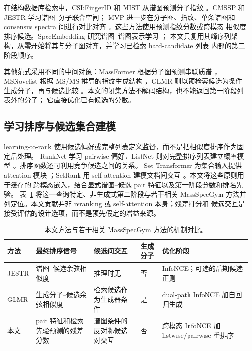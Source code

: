 \documentclass[UTF8,11pt]{ctexart}
\begin{document}
在结构数据库检索中，CSI:FingerID 和 MIST 从谱图预测分子指纹
\cite{duhrkop2015csifingerid,goldman2023mist}。CMSSP 和 JESTR 学习谱图--分子联合空间；
MVP 进一步在分子图、指纹、单条谱图和 consensus spectra 间进行对比对齐
\cite{chen2024cmssp,kalia2025jestr,chen2026mvp}。这些方法使用预测指纹分数或跨模态
相似度排序候选。SpecEmbedding 研究谱图--谱图表示学习 \cite{xiong2025specembedding}；
本文只复用其峰序列架构，从零开始将其与分子图对齐，并学习已检索 hard-candidate 列表
内部的第二阶段顺序。

其他范式采用不同的中间对象：MassFormer 根据分子图预测串联质谱
\cite{young2024massformer}，MSNovelist 根据 MS/MS 推导的指纹生成结构
\cite{stravs2022msnovelist}，GLMR 则以预检索候选为条件生成分子，再与候选比较
\cite{zhang2026glmr}。本文的闭集方法不解码结构，也不能返回第一阶段列表外的分子；
它直接优化已有候选的分数。

\subsection{学习排序与候选集合建模}

learning-to-rank 使用候选偏好或完整列表定义监督，而不是把相似度排序作为固定后处理。
RankNet 学习 pairwise 偏好，ListNet 则对完整排序列表建立概率模型
\cite{burges2005ranknet,cao2007listnet}。排序函数还可利用竞争候选之间的关系。
Set Transformer 为集合输入提供 attention 模块 \cite{lee2019settransformer}；SetRank
用 self-attention 建模文档间交互 \cite{pang2020setrank}。本文将这些原则用于缓存的
跨模态嵌入，结合显式谱图--候选 pair 特征以及第一阶段分数和排名先验。
表~\ref{tab:method_comparison_cn} 将这一查询特定、非生成式第二阶段与若干相关
MassSpecGym 方法并列定位。本文贡献并非 reranking 或 self-attention 本身；残差打分和
候选交互是接受评估的设计选项，而不是预先假定的增益来源。

\begin{table}[t]
  \centering
  \caption{本文方法与若干相关 MassSpecGym 方法的机制对比。}
  \label{tab:method_comparison_cn}
  \small
  \begin{tabular}{>{\raggedright\arraybackslash}p{1.4cm}
                  >{\raggedright\arraybackslash}p{3.1cm}
                  >{\raggedright\arraybackslash}p{2.8cm}
                  >{\raggedright\arraybackslash}p{1.8cm}
                  >{\raggedright\arraybackslash}p{3.0cm}}
    \toprule
    方法 & 最终排序信号 & 候选间交互 & 生成分子 & 优化阶段 \\
    \midrule
    JESTR & 谱图--候选余弦相似度 & 推理时无 & 否
      & InfoNCE；可选的后期候选正则 \\
    GLMR & 生成分子--候选余弦相似度 & 检索候选作为生成器条件 & 是
      & dual-path InfoNCE 加自回归生成 \\
    本文 & pair 特征和检索先验预测的残差分数
      & 谱图条件的反对称候选对交互 & 否
      & 跨模态 InfoNCE 加 listwise/pairwise 重排序 \\
    \bottomrule
  \end{tabular}
\end{table}
\end{document}
